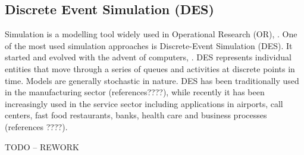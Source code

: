 \subsection{Discrete Event Simulation (DES)}
Simulation is a modelling tool widely used in Operational Research (OR), \cite{pidd2005computer}. One of the most used simulation approaches is Discrete-Event Simulation (DES). It started and evolved with the advent of computers, \cite{robinson2005}. DES represents individual entities that move through a series of queues and activities at discrete points in time. Models are generally stochastic in nature. DES has been traditionally used in the manufacturing sector (references????), while recently it has been increasingly used in the service sector including applications in airports, call centers, fast food restaurants, banks, health care \cite{Chemweno201445} and business processes (references ????).

TODO -- REWORK










